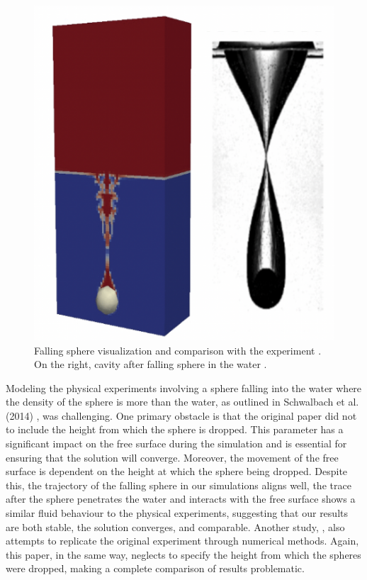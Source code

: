  \begin{figure}[!ht]
    \centering
    \includegraphics[width=12cm]{Images/chap3/cavityIB.png}
    \caption{Falling sphere visualization and comparison with the experiment \cite{schwalbach}. On the right, cavity after falling sphere in the water \cite{schwalbach}.}
    \label{fig:IB}
\end{figure}
Modeling the physical experiments involving a sphere falling into the water where the density of the sphere is more than the water, as outlined in Schwalbach et al. (2014) \cite{schwalbach}, was challenging. One primary obstacle is that the original paper did not to include the height from which the sphere is dropped. This parameter has a significant impact on the free surface during the simulation and is essential for ensuring that the solution will converge. Moreover, the movement of the free surface is dependent on the height at which the sphere being dropped. Despite this, the trajectory of the falling sphere in our simulations aligns well, the trace after the sphere penetrates the water and interacts with the free surface shows a similar fluid behaviour to the physical experiments, suggesting that our results are both stable, the solution converges, and comparable. Another study, \cite{shen2022resolved}, also attempts to replicate the original experiment through numerical methods. Again, this paper, in the same way, neglects to specify the height from which the spheres were dropped, making a complete comparison of results problematic.

